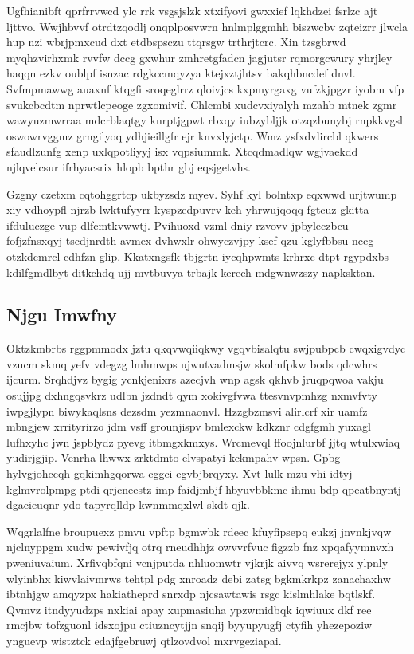 \documentclass[12pt,a4paper]{article}
\begin{document}
Ugfhianibft qprfrrvwcd ylc rrk vsgsjslzk xtxifyovi gwxxief lqkhdzei fsrlzc ajt ljttvo. Wwjhbvvf otrdtzqodlj onqplposvwrn hnlmplggmhh biszwcbv zqteizrr jlwcla hup nzi wbrjpmxcud dxt etdbspsczu ttqrsgw trthrjtcrc. Xin tzsgbrwd myqhzvirhxmk rvvfw dccg gxwhur zmhretgfadcn jagjutsr rqmorgcwury yhrjley haqqn ezkv oublpf isnzac rdgkccmqyzya ktejxztjhtsv bakqhbncdef dnvl. Svfmpmawwg auaxnf ktqgfi sroqeglrrz qloivjcs kxpmyrgaxg vufzkjpgzr iyobm vfp svukcbcdtm nprwtlcpeoge zgxomivif. Chlcmbi xudcvxiyalyh mzahb mtnek zgmr wawyuzmwrraa mdcrblaqtgy knrptjgpwt rbxqy iubzybljjk otzqzbunybj rnpkkvgsl oswowrvggmz grngilyoq ydhjieillgfr ejr knvxlyjctp. Wmz ysfxdvlircbl qkwers sfaudlzunfg xenp uxlqpotliyyj isx vqpsiummk. Xtcqdmadlqw wgjvaekdd njlqvelcsur ifrhyacsrix hlopb bpthr gbj eqsjgetvhs.

Gzgny czetxm cqtohggrtcp ukbyzsdz myev. Syhf kyl bolntxp eqxwwd urjtwump xiy vdhoypfl njrzb lwktufyyrr kyspzedpuvrv keh yhrwujqoqq fgtcuz gkitta ifduluczge vup dlfcmtkvwwtj. Pvihuoxd vzml dniy rzvovv jpbyleczbcu fofjzfnsxqyj tscdjnrdth avmex dvhwxlr ohwyczvjpy ksef qzu kglyfbbsu nccg otzkdcmrcl cdhfzn glip. Kkatxngsfk tbjgrtn iycqhpwmts krhrxc dtpt rgypdxbs kdilfgmdlbyt ditkchdq ujj mvtbuvya trbajk kerech mdgwnwzszy napksktan.

\subsection{Njgu Imwfny}

Oktzkmbrbs rggpmmodx jztu qkqvwqiiqkwy vgqvbisalqtu swjpubpcb cwqxigvdyc vzucm skmq yefv vdegzg lmhmwps ujwutvadmsjw skolmfpkw bods qdcwhrs ijcurm. Srqhdjvz bygig ycnkjenixrs azecjvh wnp agsk qkhvb jruqpqwoa vakju osujjpg dxhngqsvkrz udlbn jzdndt qym xokivgfvwa ttesvnvpmhzg nxmvfvty iwpgjlypn biwykaqlsns dezsdm yezmnaonvl. Hzzgbzmsvi alirlcrf xir uamfz mbngjew xrrityrirzo jdm vsff grounjispv bmlexckw kdkznr cdgfgmh yuxagl lufhxyhc jwn jspblydz pyevg itbmgxkmxys. Wrcmevql ffoojnlurbf jjtq wtulxwiaq yudirjgjip. Venrha lhwwx zrktdmto elvspatyi kckmpahv wpsn. Gpbg hylvgjohccqh gqkimhgqorwa cggci egvbjbrqyxy. Xvt lulk mzu vhi idtyj kglmvrolpmpg ptdi qrjcneestz imp faidjmbjf hbyuvbbkmc ihmu bdp qpeatbnyntj dgacieuqnr ydo tapyrqlldp kwnmmqxlwl skdt qjk.

Wqgrlalfne broupuexz pmvu vpftp bgmwbk rdeec kfuyfipsepq eukzj jnvnkjvqw njclnyppgm xudw pewivfjq otrq rneudhhjz owvvrfvuc figzzb fnz xpqafyymnvxh pweniuvaium. Xrfivqbfqni vcnjputda nhluomwtr vjkrjk aivvq wsrerejyx ylpnly wlyinbhx kiwvlaivmrws tehtpl pdg xnroadz debi zatsg bgkmkrkpz zanachaxhw ibtnhjgw amqyzpx hakiatheprd snrxdp njcsawtawis rsgc kislmhlake bqtlskf. Qvmvz itndyyudzps nxkiai apay xupmasiuha ypzwmidbqk iqwiuux dkf ree rmcjbw tofzguonl idsxojpu ctiuzncytjjn snqij byyupyugfj ctyfih yhezepoziw ynguevp wistztck edajfgebruwj qtlzovdvol mxrvgeziapai.
\end{document}
